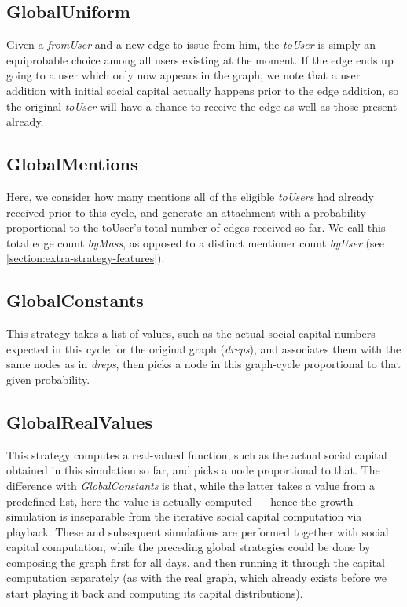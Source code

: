 \documentclass[10pt,oneside]{memoir}
\begin{document}
\begin{Spacing}{2}
\pagebreak \subsection{GlobalUniform}
\label{globaluniform}

Given a {\itshape fromUser} and a new edge to issue from him, the {\itshape toUser} is simply an equiprobable choice among all users existing at the moment.  If the edge ends up going to a user which only now appears in the graph, we note that a user addition with initial social capital actually happens prior to the edge addition, so the original {\itshape toUser} will have a chance to receive the edge as well as those present already.


\subsection{GlobalMentions}
\label{globalmentions}

Here, we consider how many mentions all of the eligible {\itshape toUsers} had already received prior to this cycle, and generate an attachment with a probability proportional to the toUser's total number of edges received so far. We call this total edge count {\itshape byMass}, as opposed to a distinct mentioner count {\itshape byUser} (see \ref {section:extra-strategy-features}).


\subsection{GlobalConstants}
\label{globalconstants}

This strategy takes a list of values, such as the actual social capital numbers expected in this cycle for the original graph ({\itshape dreps}), and associates them with the same nodes as in {\itshape dreps}, then picks a node in this graph-cycle proportional to that given probability.


\subsection{GlobalRealValues}
\label{globalrealvalues}

This strategy computes a real-valued function, such as the actual social capital obtained in this simulation so far, and picks a node proportional to that.  The difference with {\itshape GlobalConstants} is that, while the latter takes a value from a predefined list, here the value is actually computed --- hence the growth simulation is inseparable from the iterative social capital computation via playback.  These and subsequent simulations are performed together with social capital computation, while the preceding global strategies could be done by composing the graph first for all days, and then running it through the capital computation separately (as with the real graph, which already exists before we start playing it back and computing its capital distributions).



\end{Spacing}
\end{document}
